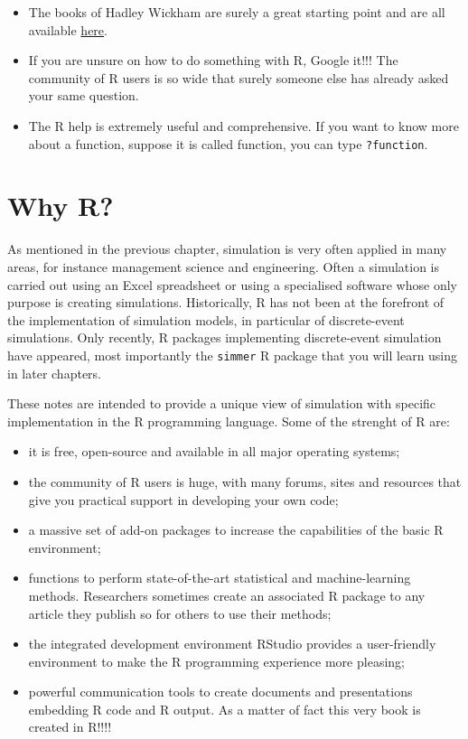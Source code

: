 \documentclass[
]{book}
\theoremstyle{definition}
\theoremstyle{definition}
\theoremstyle{definition}
\theoremstyle{definition}
\theoremstyle{remark}
\begin{document}
\begin{itemize}
\item
  The books of Hadley Wickham are surely a great starting point and are all available \href{http://hadley.nz/}{here}.
\item
  If you are unsure on how to do something with R, Google it!!! The community of R users is so wide that surely someone else has already asked your same question.
\item
  The R help is extremely useful and comprehensive. If you want to know more about a function, suppose it is called function, you can type \texttt{?function}.
\end{itemize}

\hypertarget{why-r}{%
\section{Why R?}\label{why-r}}

As mentioned in the previous chapter, simulation is very often applied in many areas, for instance management science and engineering. Often a simulation is carried out using an Excel spreadsheet or using a specialised software whose only purpose is creating simulations. Historically, R has not been at the forefront of the implementation of simulation models, in particular of discrete-event simulations. Only recently, R packages implementing discrete-event simulation have appeared, most importantly the \texttt{simmer} R package that you will learn using in later chapters.

These notes are intended to provide a unique view of simulation with specific implementation in the R programming language. Some of the strenght of R are:

\begin{itemize}
\item
  it is free, open-source and available in all major operating systems;
\item
  the community of R users is huge, with many forums, sites and resources that give you practical support in developing your own code;
\item
  a massive set of add-on packages to increase the capabilities of the basic R environment;
\item
  functions to perform state-of-the-art statistical and machine-learning methods. Researchers sometimes create an associated R package to any article they publish so for others to use their methods;
\item
  the integrated development environment RStudio provides a user-friendly environment to make the R programming experience more pleasing;
\item
  powerful communication tools to create documents and presentations embedding R code and R output. As a matter of fact this very book is created in R!!!!
\end{itemize}
\end{document}
